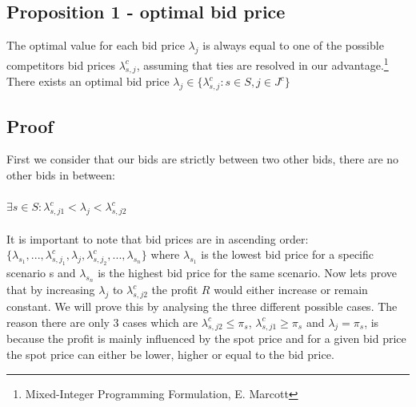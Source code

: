 \documentclass[letterpaper]{article}
\begin{document}
\subsection{Proposition 1 - optimal bid price}
The optimal value for each bid price $\lambda_j$ is always equal to one of the possible competitors bid prices $\lambda_{s,j}^c$, assuming that ties are resolved in our advantage.\footnote{Mixed-Integer Programming Formulation, E. Marcott}
There exists an optimal bid price $\lambda_j \in \{\lambda^c_{s,j}: s \in S, j \in J^c \}$
\subsection{Proof}
First we consider that our bids are strictly between two other bids, there are no other bids in between:\\ \\
$\exists s \in S:\lambda_{s,j1}^c < \lambda_j < \lambda_{s,j2}^c$ \\ \\
It is important to note that bid prices are in ascending order:\\
$ \{ \lambda_{s_1}, ..., \lambda^c_{s,j_1}, \lambda_j, \lambda^c_{s,j_2}, ...,\lambda_{s_n} \}$
where $\lambda_{s_1}$ is the lowest bid price for a specific scenario s and $\lambda_{s_n}$ is the highest bid price for the same scenario.
Now lets prove that by increasing $\lambda_j$ to $\lambda_{s,j2}^c$ the profit $R$ would either increase or remain constant. We will prove this by analysing the three different possible cases. The reason there are only 3 cases which are  $\lambda_{s,j2}^c \leq \pi_s$, $\lambda_{s,j1}^c \geq \pi_s$ and $\lambda_j = \pi_s$, is because the profit is mainly influenced by the spot price and for a given bid price the spot price can either be lower, higher or equal to the bid price.
\end{document}
